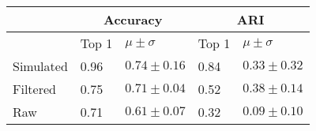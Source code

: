 \begin{tabular}{lllll}
\toprule
{} & \multicolumn{2}{c}{Accuracy} &   \multicolumn{2}{c}{ARI} \\
\midrule
{} & Top 1 &  $\mu \pm \sigma$ & Top 1 & $\mu \pm \sigma$ \\
Simulated &  0.96 &  $0.74 \pm 0.16 $  & 0.84 &  $0.33 \pm 0.32 $\\
Filtered  & 0.75 &  $0.71 \pm 0.04 $ & 0.52 &  $0.38 \pm 0.14 $\\
Raw & 0.71 &  $0.61 \pm 0.07 $ &  0.32 &  $0.09 \pm 0.10 $   \\
\bottomrule
\end{tabular}
